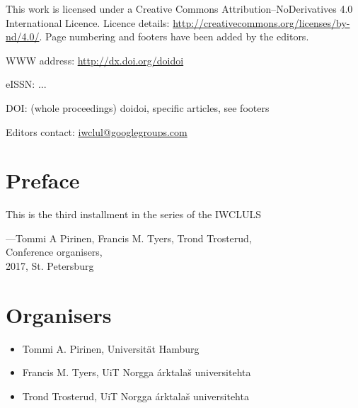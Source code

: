 \documentclass[b5paper]{book}
\newcommand\thedoi{doidoi}
\begin{document}
\frontmatter

\cleardoublepage
\thispagestyle{empty}
{\centering{}}

This work is licensed under a Creative Commons Attribution–NoDerivatives
4.0 International Licence.  Licence details:
\url{http://creativecommons.org/licenses/by-nd/4.0/}. Page numbering and
footers have been added by the editors.

WWW address: \url{http://dx.doi.org/\thedoi}

eISSN: ...

DOI: (whole proceedings) \thedoi, specific articles, see footers

Editors contact: \url{iwclul@googlegroups.com}

\clearpage

\renewcommand\thedoi{doidoi}

\pagestyle{fancy}

\chapter*{Preface}

This is the third installment in the series of the 
IWCLULS

\noindent ---Tommi A Pirinen, Francis M. Tyers, Trond Trosterud,\\
Conference organisers,\\
2017, St. Petersburg

\renewcommand\thedoi{doidoi}

\chapter*{Organisers}

\begin{itemize}
    \item Tommi A. Pirinen, Universität Hamburg
    \item Francis M. Tyers, UiT Norgga árktalaš universitehta
    \item Trond Trosterud, UiT Norgga árktalaš universitehta
\end{itemize}
\end{document}
